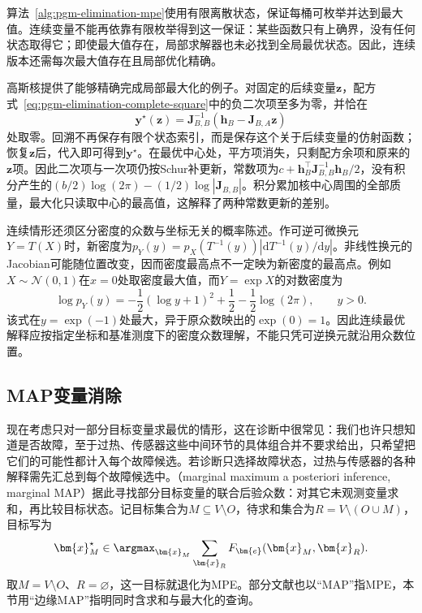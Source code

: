 算法~\ref{alg:pgm-elimination-mpe}使用有限离散状态，保证每桶可枚举并达到最大值。连续变量不能再依靠有限枚举得到这一保证：某些函数只有上确界，没有任何状态取得它；即使最大值存在，局部求解器也未必找到全局最优状态。因此，连续版本还需每次最大值存在且局部优化精确。

高斯核提供了能够精确完成局部最大化的例子。对固定的后续变量$\bm{z}$，配方式~\eqref{eq:pgm-elimination-complete-square}中的负二次项至多为零，并恰在
\[
  \bm{y}^\star(\bm{z})
  =\bm{J}_{B,B}^{-1}(\bm{h}_B-\bm{J}_{B,A}\bm{z})
\]
处取零。回溯不再保存有限个状态索引，而是保存这个关于后续变量的仿射函数；恢复$\bm{z}$后，代入即可得到$\bm{y}^\star$。在最优中心处，平方项消失，只剩配方余项和原来的$\bm{z}$项。因此二次项与一次项仍按Schur补更新，常数项为$c+\bm{h}_B^\top\bm{J}_{B,B}^{-1}\bm{h}_B/2$，没有积分产生的$(b/2)\log(2\pi)-(1/2)\log|\bm{J}_{B,B}|$。积分累加核中心周围的全部质量，最大化只读取中心的最高值，这解释了两种常数更新的差别。

连续情形还须区分密度的众数与坐标无关的概率陈述。作可逆可微换元$Y=T(X)$时，新密度为$p_Y(y)=p_X(T^{-1}(y))\left|\mathrm{d}T^{-1}(y)/\mathrm{d}y\right|$。非线性换元的Jacobian可能随位置改变，因而密度最高点不一定映为新密度的最高点。例如$X\sim\mathcal{N}(0,1)$在$x=0$处取密度最大值，而$Y=\exp X$的对数密度为
\[
  \log p_Y(y)
  =-\frac12(\log y+1)^2+\frac12-\frac12\log(2\pi),
  \qquad y>0.
\]
该式在$y=\exp(-1)$处最大，异于原众数映出的$\exp(0)=1$。因此连续最优解释应按指定坐标和基准测度下的密度众数理解，不能只凭可逆换元就沿用众数位置。

\subsection{MAP变量消除}
\label{sec:pgm-elimination-map}

现在考虑只对一部分目标变量求最优的情形，这在诊断中很常见：我们也许只想知道是否故障，至于过热、传感器这些中间环节的具体组合并不要求给出，只希望把它们的可能性都计入每个故障候选。若诊断只选择故障状态，过热与传感器的各种解释需先汇总到每个故障候选中。（marginal maximum a posteriori inference, marginal MAP）据此寻找部分目标变量的联合后验众数：对其它未观测变量求和，再比较目标状态。记目标集合为$M\subseteq V\setminus O$，待求和集合为$R=V\setminus(O\cup M)$，目标写为
\begin{equation}
  \bm{x}_M^\star
  \in\argmax_{\bm{x}_M}\sum_{\bm{x}_R}
       F_{\bm{e}}(\bm{x}_M,\bm{x}_R).
  \label{eq:pgm-elimination-map-objective}
\end{equation}
取$M=V\setminus O$、$R=\varnothing$，这一目标就退化为MPE。部分文献也以“MAP”指MPE，本节用“边缘MAP”指明同时含求和与最大化的查询。

